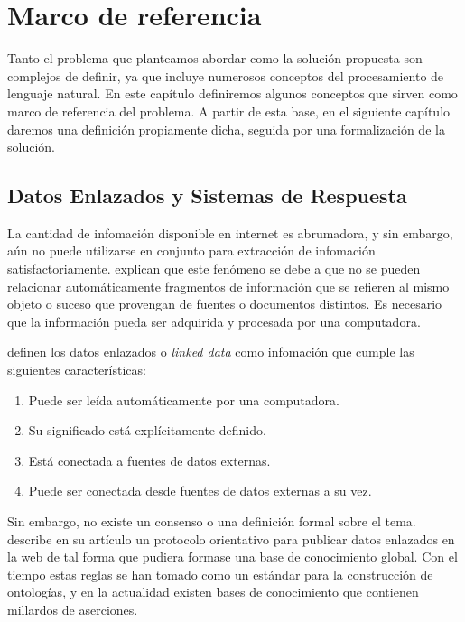 
\chapter{Marco de referencia}

Tanto el problema que planteamos abordar como la solución propuesta son complejos de definir, ya que incluye numerosos conceptos del procesamiento de lenguaje natural. En este capítulo definiremos algunos conceptos que sirven como marco de referencia del problema. A partir de esta base, en el siguiente capítulo daremos una definición propiamente dicha, seguida por una formalización de la solución.

\section{Datos Enlazados y Sistemas de Respuesta}

La cantidad de infomación disponible en internet es abrumadora, y sin embargo, aún no puede utilizarse en conjunto para extracción de infomación satisfactoriamente. \citet{BernersLeeLinkedDataGuide} explican que este fenómeno se debe a que no se pueden relacionar automáticamente fragmentos de información que se refieren al mismo objeto o suceso que provengan de fuentes o documentos distintos. Es necesario que la información pueda ser adquirida y procesada por una computadora.

\citet{BizerLinkedData} definen los datos enlazados o \textit{linked data} como infomación que cumple las siguientes características:
\begin{enumerate}
    \item Puede ser leída automáticamente por una computadora.
    \item Su significado está explícitamente definido.
    \item Está conectada a fuentes de datos externas.
    \item Puede ser conectada desde fuentes de datos externas a su vez.
\end{enumerate}
Sin embargo, no existe un consenso o una definición formal sobre el tema. \citet{BernersLeeLinkedDataGuide} describe en su artículo un protocolo orientativo para publicar datos enlazados en la web de tal forma que pudiera formase una base de conocimiento global. Con el tiempo estas reglas se han tomado como un estándar para la construcción de ontologías, y en la actualidad existen bases de conocimiento que contienen millardos de aserciones.

